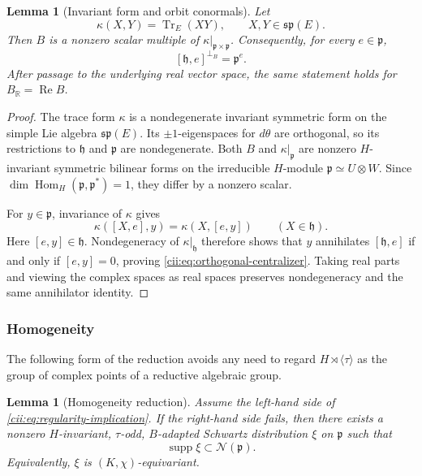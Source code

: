 \documentclass[11pt,reqno]{amsart}
\numberwithin{equation}{section}
\newtheorem{lemma}[theorem]{Lemma}
\theoremstyle{definition}
\theoremstyle{remark}
\newcommand{\R}{\mathbb R}
\newcommand{\Hom}{\operatorname{Hom}}
\newcommand{\Tr}{\operatorname{Tr}}
\newcommand{\supp}{\operatorname{supp}}
\newcommand{\cN}{\mathcal N}
\begin{document}
\begin{lemma}[Invariant form and orbit conormals]\label{cii:lem:B-centralizer}
Let
\[
  \kappa(X,Y)=\Tr_E(XY),\qquad X,Y\in\mathfrak{sp}(E).
\]
Then \(B\) is a nonzero scalar multiple of
\(\kappa|_{\mathfrak p\times\mathfrak p}\).  Consequently, for every
\(e\in\mathfrak p\),
\begin{equation}\label{cii:eq:orthogonal-centralizer}
  [\mathfrak h,e]^{\perp_B}=\mathfrak p^e.
\end{equation}
After passage to the underlying real vector space, the same statement holds
for \(B_{\R}=\operatorname{Re}B\).
\end{lemma}

\begin{proof}
The trace form \(\kappa\) is a nondegenerate invariant symmetric form on the
simple Lie algebra \(\mathfrak{sp}(E)\).  Its \(\pm1\)-eigenspaces for
\(d\theta\) are orthogonal, so its restrictions to \(\mathfrak h\) and
\(\mathfrak p\) are nondegenerate.  Both \(B\) and
\(\kappa|_{\mathfrak p}\) are nonzero \(H\)-invariant symmetric bilinear
forms on the irreducible \(H\)-module
\(\mathfrak p\simeq U\otimes W\).  Since
\(\dim\Hom_H(\mathfrak p,\mathfrak p^*)=1\), they differ by a nonzero
scalar.

For \(y\in\mathfrak p\), invariance of \(\kappa\) gives
\[
  \kappa([X,e],y)=\kappa(X,[e,y])\qquad(X\in\mathfrak h).
\]
Here \([e,y]\in\mathfrak h\).  Nondegeneracy of \(\kappa|_{\mathfrak h}\)
therefore shows that \(y\) annihilates \([\mathfrak h,e]\) if and only if
\([e,y]=0\), proving \eqref{cii:eq:orthogonal-centralizer}.  Taking real parts
and viewing the complex spaces as real spaces preserves nondegeneracy and the
same annihilator identity.
\end{proof}

\subsubsection{Homogeneity}

The following form of the reduction avoids any need to regard
\(H\rtimes\langle\tau\rangle\) as the group of complex points of a
reductive algebraic group.

\begin{lemma}[Homogeneity reduction]\label{cii:lem:homogeneity}
Assume the left-hand side of \eqref{cii:eq:regularity-implication}.  If the
right-hand side fails, then there exists a nonzero \(H\)-invariant,
\(\tau\)-odd, \(B\)-adapted Schwartz distribution \(\xi\) on
\(\mathfrak p\) such that
\[
\supp\xi\subset\cN(\mathfrak p).
\]
Equivalently, \(\xi\) is \((K,\chi)\)-equivariant.
\end{lemma}
\end{document}
